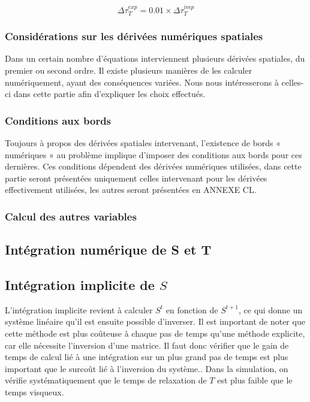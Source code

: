 \begin{equation}
\Delta \tau_{T}^{exp} = 0.01 \times \Delta \tau_{T}^{imp}
\end{equation}

\subsubsection{Considérations sur les dérivées numériques spatiales}

Dans un certain nombre d’équations interviennent plusieurs dérivées spatiales,
du premier ou second ordre. Il existe plusieurs manières de les calculer
numériquement, ayant des conséquences variées. Nous nous intéresserons à
celles-ci dans cette partie afin d’expliquer les choix effectués.

\subsubsection{Conditions aux bords}

Toujours à propos des dérivées spatiales intervenant, l’existence de bords «
numériques » au problème implique d’imposer des conditions aux bords pour ces
dernières. Ces conditions dépendent des dérivées numériques utilisées, dans
cette partie seront présentées uniquement celles intervenant pour les dérivées
effectivement utilisées, les autres seront présentées en ANNEXE CL.

\subsubsection{Calcul des autres variables}

%

\subsection{Intégration numérique de S et T}\subsection{Intégration implicite de $S$}
\label{ssec:integration_S_imp}
L'intégration implicite revient à calculer $S^t$ en fonction de $S^{t+1}$, ce qui donne un système linéaire qu'il est ensuite possible d'inverser. Il est important de noter que cette méthode est plus coûteuse à chaque pas de temps qu'une méthode explicite, car elle nécessite l'inversion d'une matrice. Il faut donc vérifier que le gain de temps de calcul lié à une intégration sur un plus grand pas de temps est plus important que le surcoût lié à l'inversion du système.. Dans la simulation, on vérifie systématiquement que le temps de relaxation de $T$ est plus faible que le temps visqueux.

